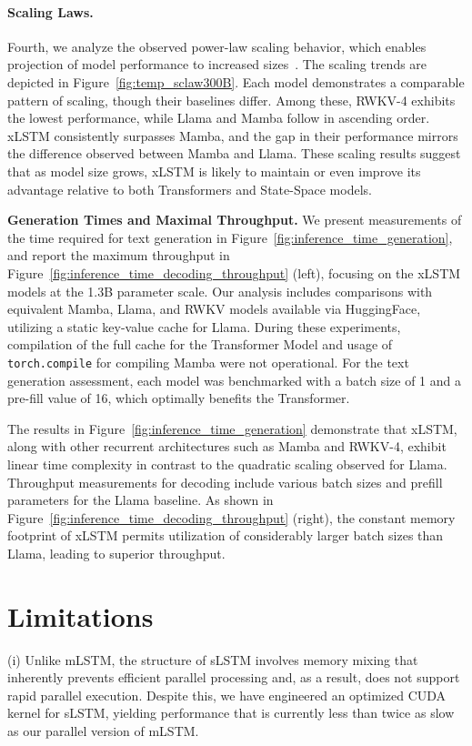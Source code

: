 \paragraph{Scaling Laws.} Fourth, we analyze the observed power-law scaling behavior, which enables projection of model performance to increased sizes~\citep{Kaplan:20,Brown:20short}. The scaling trends are depicted in Figure~\ref{fig:temp_sclaw300B}. Each model demonstrates a comparable pattern of scaling, though their baselines differ. Among these, RWKV-4 exhibits the lowest performance, while Llama and Mamba follow in ascending order. xLSTM consistently surpasses Mamba, and the gap in their performance mirrors the difference observed between Mamba and Llama. These scaling results suggest that as model size grows, xLSTM is likely to maintain or even improve its advantage relative to both Transformers and State-Space models.

\textbf{Generation Times and Maximal Throughput.} We present measurements of the time required for text generation in Figure~\ref{fig:inference_time_generation}, and report the maximum throughput in Figure~\ref{fig:inference_time_decoding_throughput} (left), focusing on the xLSTM models at the 1.3B parameter scale. Our analysis includes comparisons with equivalent Mamba, Llama, and RWKV models available via HuggingFace, utilizing a static key-value cache for Llama. During these experiments, compilation of the full cache for the Transformer Model and usage of \texttt{torch.compile} for compiling Mamba were not operational. For the text generation assessment, each model was benchmarked with a batch size of 1 and a pre-fill value of 16, which optimally benefits the Transformer.

The results in Figure~\ref{fig:inference_time_generation} demonstrate that xLSTM, along with other recurrent architectures such as Mamba and RWKV-4, exhibit linear time complexity in contrast to the quadratic scaling observed for Llama. Throughput measurements for decoding include various batch sizes and prefill parameters for the Llama baseline. As shown in Figure~\ref{fig:inference_time_decoding_throughput} (right), the constant memory footprint of xLSTM permits utilization of considerably larger batch sizes than Llama, leading to superior throughput.

\section{Limitations}

(i) Unlike mLSTM, the structure of sLSTM involves memory mixing that inherently prevents efficient parallel processing and, as a result, does not support rapid parallel execution. Despite this, we have engineered an optimized CUDA kernel for sLSTM, yielding performance that is currently less than twice as slow as our parallel version of mLSTM.

